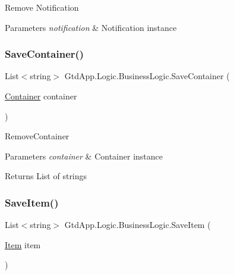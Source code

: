 Remove Notification 


\begin{DoxyParams}{Parameters}
{\em notification} & Notification instance\\
\hline
\end{DoxyParams}
\mbox{\label{class_gtd_app_1_1_logic_1_1_business_logic_af56ec90b26a3fa39f67a6c54e3be2f9d}} 
\subsubsection{\texorpdfstring{Save\+Container()}{SaveContainer()}}
{\footnotesize\ttfamily List$<$string$>$ Gtd\+App.\+Logic.\+Business\+Logic.\+Save\+Container (\begin{DoxyParamCaption}\item[{\mbox{\hyperlink{class_gtd_app_1_1_data_1_1_container}{Container}}}]{container }\end{DoxyParamCaption})}



Remove\+Container 


\begin{DoxyParams}{Parameters}
{\em container} & Container instance\\
\hline
\end{DoxyParams}
\begin{DoxyReturn}{Returns}
List of strings
\end{DoxyReturn}
\mbox{\label{class_gtd_app_1_1_logic_1_1_business_logic_aa2d4df27597225785568ee11da249971}} 
\subsubsection{\texorpdfstring{Save\+Item()}{SaveItem()}}
{\footnotesize\ttfamily List$<$string$>$ Gtd\+App.\+Logic.\+Business\+Logic.\+Save\+Item (\begin{DoxyParamCaption}\item[{\mbox{\hyperlink{class_gtd_app_1_1_data_1_1_item}{Item}}}]{item }\end{DoxyParamCaption})}



